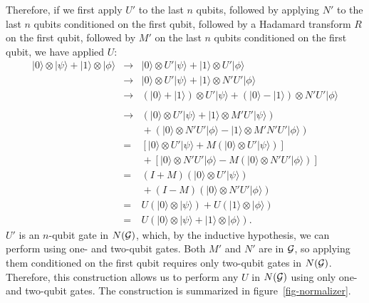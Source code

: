 \documentclass{report}
\newcommand{\G}{{\cal G}}
\newcommand{\ket}[1]{|{#1}\rangle}
\begin{document}
Therefore, if we first apply $U'$ to the last $n$ qubits, followed by applying
$N'$ to the last $n$ qubits conditioned on the first qubit, followed by a 
Hadamard transform $R$ on the first qubit, followed by $M'$ on the last $n$ 
qubits conditioned on the first qubit, we have applied $U$:
\begin{eqnarray}
\ket{0} \otimes \ket{\psi} + \ket{1} \otimes \ket{\phi}
& \rightarrow & \ket{0} \otimes U' \ket{\psi} + \ket{1} \otimes U' 
\ket{\phi} \\
& \rightarrow & \ket{0} \otimes U' \ket{\psi} + \ket{1} \otimes N' U' 
\ket{\phi} \\
& \rightarrow & (\ket{0} + \ket{1}) \otimes U' \ket{\psi} + (\ket{0} - 
\ket{1}) \otimes N' U' \ket{\phi} \nonumber \\ \\
& \rightarrow & (\ket{0} \otimes U' \ket{\psi} + \ket{1} \otimes M' U' 
\ket{\psi}) \nonumber \\
& & \mbox{} + (\ket{0} \otimes N' U' \ket{\phi} - \ket{1} \otimes M' N' U' 
\ket{\phi}) \\
& = & \left[ \ket{0} \otimes U' \ket{\psi} + M (\ket{0} \otimes U' 
\ket{\psi}) \right] \nonumber \\
& & \mbox{} + \left[ \ket{0} \otimes N' U' \ket{\phi} - M (\ket{0} 
\otimes N' U' \ket{\phi}) \right] \\
& = & (I + M) (\ket{0} \otimes U' \ket{\psi}) \nonumber \\
& & \mbox{} + (I - M) (\ket{0} \otimes N' U' \ket{\phi}) \\
& = & U (\ket{0} \otimes \ket{\psi}) + U (\ket{1} \otimes \ket{\phi}) \\
& = & U (\ket{0} \otimes \ket{\psi} + \ket{1} \otimes \ket{\phi}).
\end{eqnarray}
$U'$ is an $n$-qubit gate in $N(\G)$, which, by the inductive hypothesis, we 
can perform using one- and two-qubit gates.  Both $M'$ and $N'$ are in $\G$, so 
applying them conditioned on the first qubit requires only two-qubit gates 
in $N(\G)$.  Therefore, this construction allows us to perform any $U$ in 
$N(\G)$ using only one- and two-qubit gates.  The construction is summarized
in figure~\ref{fig-normalizer}.
\end{document}

